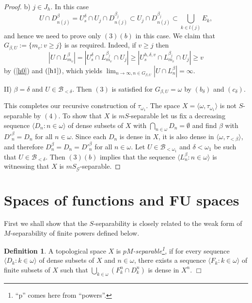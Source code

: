 \documentclass[12pt,a4paper]{amsart}
\theoremstyle{definition}
\newtheorem{definition}[theorem]{Definition}
\newcommand{\w}{\omega}
\newcommand{\B}{\mathcal{B}}
\newcommand{\CG}{\mathcal{G}}
\newcommand{\la}{\langle}
\newcommand{\ra}{\rangle}
\begin{document}
\begin{proof}
b)\; $j\in J_h$. In this case 
$$U\cap D^\beta_{n(j)}=U^\delta_s\cap U_j\cap D^{\beta_j}_{n(j)}\subset
U_j\cap D^{\beta_j}_{n(j)}\subset\bigcup_{k\in l(j)}E_k,$$
and hence we need to prove only $(3)(b)$ in this case.
We claim that 
$G_{\beta,U}:=\{m_{v}:v\geq j\}$
is as required. Indeed, if
$v\geq j$  then 
$$|U\cap L^\beta_{m_v}|=|U^\delta_s\cap L^{\beta_j}_{m_v}\cap U_j|\geq 
|U^{h,\delta,v}_s\cap  L^{\beta_j}_{m_v}\cap U_j|\geq v$$
by (\ref{h0}) and $(\ref{h1})$, which yields 
$\lim_{n\to\infty,n\in G_{\beta,U}}|U\cap L^\beta_{n}|=\infty.$

II)\;  $\beta=\delta$ and $U\in\B_{<\delta}$. Then $(3)$ is satisfied 
for $G_{\beta,U}=\w$ by $(b_\delta)$ and $(c_\delta)$.


This completes our recursive construction of $\tau_{\w_1}$.
The space $X=\la\w,\tau_{\w_1}\ra$ is not $S$-separable
by $(4)$. To show that $X$ is $mS$-separable let us fix 
a decreasing sequence
$\la D_n:n\in\w\ra$ of dense subsets of $X$ with $\bigcap_{n\in\w}D_n=\emptyset$
and find $\beta$ with $D'^\beta_n=D_n$ for all $n\in\w$.
Since each $D_n$
 is dense in $X$, it is also dense in $\la\w,\tau_{<\beta}\ra$,
 and therefore $D^\beta_n=D_n=D'^\beta_n$ for all $n\in\w$.
 Let $U\in\B_{<\w_1}$ and $\delta<\w_1$ be such that $U\in\B_{<\delta}$.
 Then $(3)(b)$ implies that the sequence
 $\la L^\beta_n:n\in\w\ra$ is witnessing that $X$ is 
 $mS_{\CG}$-separable.
\end{proof}








\section{Spaces of functions and FU spaces}

First we shall show that the $S$-separability is closely related to the weak
form of $M$-separability of finite powers defined below.

\begin{definition}
 A topological space  $X$ is \emph{$pM$-separable\footnote{``p'' comes here from ``powers''.},}  if for every sequence $\la D_k:k\in\w\ra$ of dense subsets of 
 $X$ and $n\in\w$, there exists a sequence $\la F_k:k\in\w\ra$ of finite subsets 
 of $X$ such that $\bigcup_{k\in\w} (F_k^n\cap D_k^n)$ is dense in $X^n$. \hfill $\Box$
\end{definition}
\end{document}
